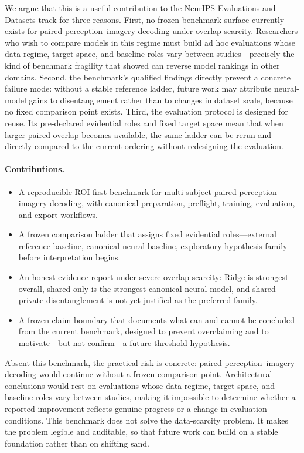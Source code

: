 \documentclass{article}
\begin{document}
We argue that this is a useful contribution to the NeurIPS Evaluations and
Datasets track for three reasons.  First, no frozen benchmark surface currently
exists for paired perception--imagery decoding under overlap scarcity.
Researchers who wish to compare models in this regime must build ad hoc
evaluations whose data regime, target space, and baseline roles vary between
studies---precisely the kind of benchmark fragility that
\citet{dehghani2021benchmark} showed can reverse model rankings in other
domains.  Second, the benchmark's qualified findings directly prevent a concrete
failure mode: without a stable reference ladder, future work may attribute
neural-model gains to disentanglement rather than to changes in dataset scale,
because no fixed comparison point exists.  Third, the evaluation protocol is
designed for reuse.  Its pre-declared evidential roles and fixed target space
mean that when larger paired overlap becomes available, the same ladder can be
rerun and directly compared to the current ordering without redesigning the
evaluation.

\paragraph{Contributions.}
\begin{itemize}[nosep,leftmargin=1.5em]
\item A reproducible ROI-first benchmark for multi-subject paired
  perception--imagery decoding, with canonical preparation, preflight,
  training, evaluation, and export workflows.
\item A frozen comparison ladder that assigns fixed evidential roles---external
  reference baseline, canonical neural baseline, exploratory hypothesis
  family---before interpretation begins.
\item An honest evidence report under severe overlap scarcity: Ridge is
  strongest overall, shared-only is the strongest canonical neural model, and
  shared-private disentanglement is not yet justified as the preferred family.
\item A frozen claim boundary that documents what can and cannot be concluded
  from the current benchmark, designed to prevent overclaiming and to
  motivate---but not confirm---a future threshold hypothesis.
\end{itemize}

\noindent
Absent this benchmark, the practical risk is concrete: paired
perception--imagery decoding would continue without a frozen comparison point.
Architectural conclusions would rest on evaluations whose data regime, target
space, and baseline roles vary between studies, making it impossible to
determine whether a reported improvement reflects genuine progress or a change
in evaluation conditions.  This benchmark does not solve the data-scarcity
problem.  It makes the problem legible and auditable, so that future work can
build on a stable foundation rather than on shifting sand.
\end{document}
